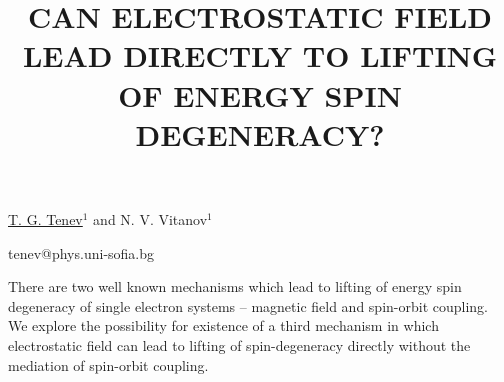 \title{CAN ELECTROSTATIC FIELD LEAD DIRECTLY TO LIFTING OF ENERGY SPIN DEGENERACY?}

\underline{T. G. Tenev}$^{1}$ and N. V. Vitanov$^{1}$  

{\normalsize{

\vspace{-4mm}\unisofia

\email tenev@phys.uni-sofia.bg}}

There are two well known mechanisms which lead to lifting of energy spin degeneracy of single electron systems -- magnetic field and spin-orbit coupling. We explore the possibility for existence of a third mechanism in which electrostatic field can lead to lifting of spin-degeneracy directly without the mediation of spin-orbit coupling.

\vspace{\baselineskip}
